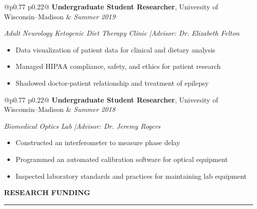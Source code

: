 \documentclass[12pt]{article}
\makeatletter
\newcommand{\sectionheading}[1]{%
    \vspace{1.2ex}%
    {\large\bfseries\MakeUppercase{#1}}\par\vspace{0.3ex}%
    {\color[gray]{0.6}\rule{0.98\linewidth}{0.3pt}}\vspace{0.6ex}%
  }
\newcommand{\sectionheading}[1]{%
    \vspace{1.2ex}%
    {\large\bfseries{\SansHead \MakeUppercase{#1}}}\par\vspace{0.3ex}%
    {\color[gray]{0.6}\rule{0.98\linewidth}{0.3pt}}\vspace{0.6ex}%
  }
\newcommand{\jobtitle}[1]{\textbf{#1}} %
\newcommand{\institution}[1]{#1} %
\newcommand{\dateinfo}[1]{\textit{#1}} %
\newcommand{\contactsep}{\;|\;} %
\newenvironment{contenttabular}[1]{%
  \begin{tabular*}{\textwidth}{@{}p{0.77\textwidth} p{0.22\textwidth}@{}}%
}{%
  \end{tabular*}%
}
\newcommand{\contentvspace}{\vspace{0.6ex}} %
\makeatother
\begin{document}
\noindent\begin{contenttabular}{\textwidth}\jobtitle{Undergraduate Student Researcher}, \institution{University of Wisconsin--Madison} & \dateinfo{Summer 2019}\\\end{contenttabular}
\contentvspace
\dateinfo{Adult Neurology Ketogenic Diet Therapy Clinic \contactsep Advisor: Dr. Elizabeth Felton}
\begin{itemize}
  \item Data visualization of patient data for clinical and dietary analysis
  \item Managed HIPAA compliance, safety, and ethics for patient research
  \item Shadowed doctor-patient relationship and treatment of epilepsy
\end{itemize}

\noindent\begin{contenttabular}{\textwidth}\jobtitle{Undergraduate Student Researcher}, \institution{University of Wisconsin--Madison} & \dateinfo{Summer 2018}\\\end{contenttabular}
\contentvspace
\dateinfo{Biomedical Optics Lab \contactsep Advisor: Dr. Jeremy Rogers}
\begin{itemize}
  \item Constructed an interferometer to measure phase delay
  \item Programmed an automated calibration software for optical equipment
  \item Inspected laboratory standards and practices for maintaining lab equipment
\end{itemize}


\sectionheading{Research Funding}
\end{document}
